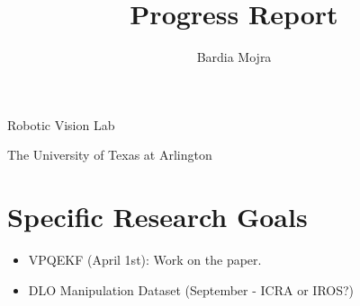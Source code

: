 \documentclass[11pt]{article}
\title{Progress Report}
\author{Bardia Mojra}
\begin{document}
\maketitle
\thispagestyle{empty}

\bigskip
\bigskip
\begin{center}
 Robotic Vision Lab
\end{center}

\begin{center}
The University of Texas at Arlington
\end{center}

\newpage

\section{Specific Research Goals}
\begin{itemize}
      \item VPQEKF (April 1st): Work on the paper.
      \item DLO Manipulation Dataset (September - ICRA or IROS?)
\end{itemize}
\end{document}
